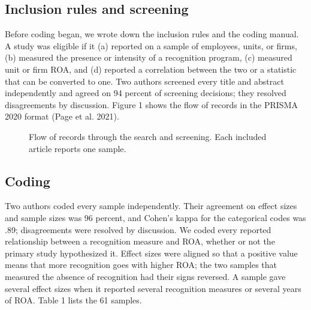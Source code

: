 \documentclass[11pt]{article}
\begin{document}
\subsection{Inclusion rules and screening}

Before coding began, we wrote down the inclusion rules and the coding manual. A study was eligible if it (a) reported on a sample of employees, units, or firms, (b) measured the presence or intensity of a recognition program, (c) measured unit or firm ROA, and (d) reported a correlation between the two or a statistic that can be converted to one. Two authors screened every title and abstract independently and agreed on 94 percent of screening decisions; they resolved disagreements by discussion. Figure 1 shows the flow of records in the PRISMA 2020 format (Page et al. 2021).

\begin{figure}[H]
\centering
{}
\caption{Flow of records through the search and screening. Each included article reports one sample.}
\end{figure}

\subsection{Coding}

Two authors coded every sample independently. Their agreement on effect sizes and sample sizes was 96 percent, and Cohen's kappa for the categorical codes was .89; disagreements were resolved by discussion. We coded every reported relationship between a recognition measure and ROA, whether or not the primary study hypothesized it. Effect sizes were aligned so that a positive value means that more recognition goes with higher ROA; the two samples that measured the absence of recognition had their signs reversed. A sample gave several effect sizes when it reported several recognition measures or several years of ROA. Table 1 lists the 61 samples.
\end{document}
